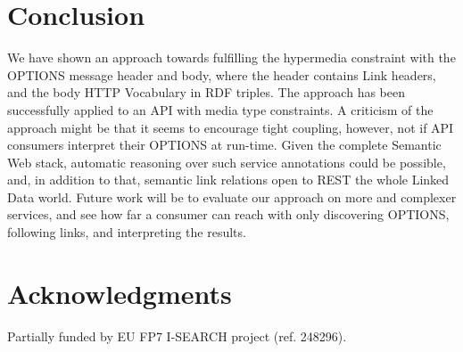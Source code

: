 \documentclass{acm_proc_article-sp}
\begin{document}
\section{Conclusion}\label{sec:relatedwork}
We have shown an approach towards fulfilling the hypermedia constraint with the OPTIONS message header and body, where the header contains Link headers, and the body HTTP Vocabulary in RDF triples. The approach has been successfully applied to an API with media type constraints. A criticism of the approach might be that it seems to encourage tight coupling, however, not if API consumers interpret their OPTIONS at run-time. Given the complete Semantic Web stack, automatic reasoning over such service annotations could be possible, and, in addition to that, semantic link relations open to REST the whole Linked Data world. Future work will be to evaluate our approach on more and complexer services, and see how far a consumer can reach with only discovering OPTIONS, following links, and interpreting the results.


\section{Acknowledgments}\label{sec:acknowledgments}
Partially funded by EU FP7 I-SEARCH project (ref. 248296).

%

%
%

\end{document}

